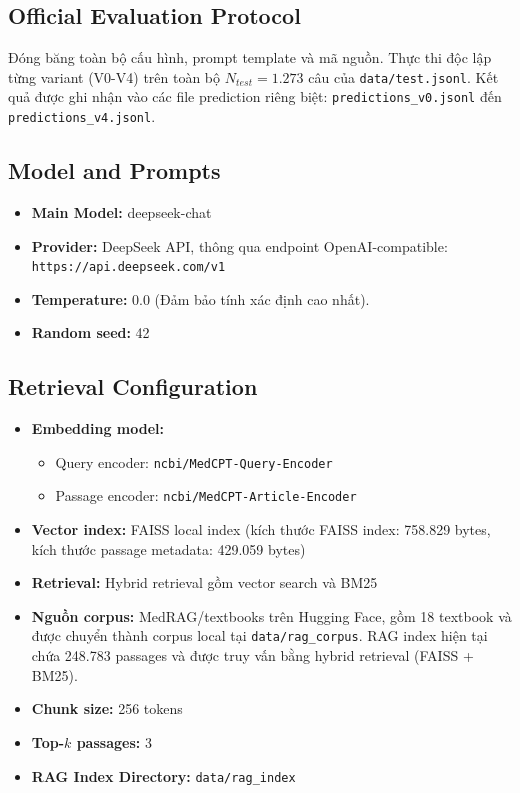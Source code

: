 \subsection{Official Evaluation Protocol}
Đóng băng toàn bộ cấu hình, prompt template và mã nguồn. Thực thi độc lập từng variant (V0-V4) trên toàn bộ $N_{test} = 1.273$ câu của \texttt{data/test.jsonl}. Kết quả được ghi nhận vào các file prediction riêng biệt: \texttt{predictions\_v0.jsonl} đến \texttt{predictions\_v4.jsonl}.

\subsection{Model and Prompts}
\begin{itemize}
    \item \textbf{Main Model:} deepseek-chat
    \item \textbf{Provider:} DeepSeek API, thông qua endpoint OpenAI-compatible: \texttt{https://api.deepseek.com/v1}
    \item \textbf{Temperature:} 0.0 (Đảm bảo tính xác định cao nhất).
    \item \textbf{Random seed:} 42
\end{itemize}

\subsection{Retrieval Configuration}
\begin{itemize}
    \item \textbf{Embedding model:}
    \begin{itemize}
        \item Query encoder: \texttt{ncbi/MedCPT-Query-Encoder}
        \item Passage encoder: \texttt{ncbi/MedCPT-Article-Encoder}
    \end{itemize}
    \item \textbf{Vector index:} FAISS local index (kích thước FAISS index: 758.829 bytes, kích thước passage metadata: 429.059 bytes)
    \item \textbf{Retrieval:} Hybrid retrieval gồm vector search và BM25
    \item \textbf{Nguồn corpus:} MedRAG/textbooks trên Hugging Face, gồm 18 textbook và được chuyển thành corpus local tại \texttt{data/rag\_corpus}. RAG index hiện tại chứa 248.783 passages và được truy vấn bằng hybrid retrieval (FAISS + BM25).
    \item \textbf{Chunk size:} 256 tokens
    \item \textbf{Top-$k$ passages:} 3
    \item \textbf{RAG Index Directory:} \texttt{data/rag\_index}
\end{itemize}


